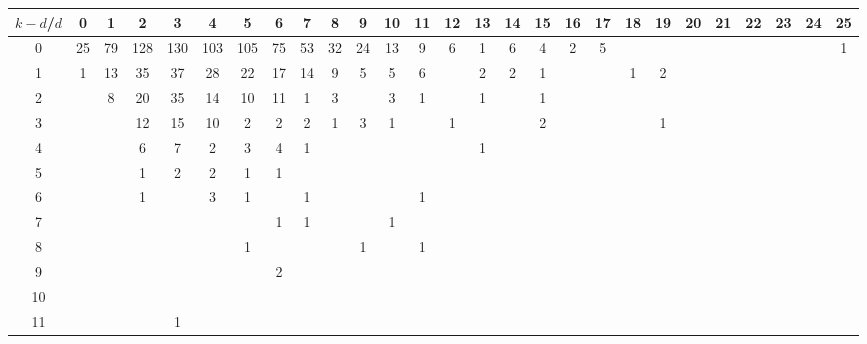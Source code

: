 \begin{landscape}

\begin{table}[h]\footnotesize
{\centering
\begin{tabular}{|c|c|
c|c|c|c|c|c|c|c|c|c|c|c|c|c|c|c|c|c|c|c|c|c|c|c|c|}
  \hline
  $k-d$/$d$
 & 0 & 1 & 2 & 3 & 4 & 5 & 6 & 7 & 8 & 9 & 10 & 11 & 12 & 13 & 14 & 15 & 16 & 17 & 18 & 19 & 20 & 21 & 22 & 23 & 24 & 25\\

  \hline
  \hline

0  & 25 & 79 & 128 & 130 & 103 & 105 & 75 & 53 & 32 & 24 & 13 & 9 & 6 & 1 & 6 & 4 & 2 & 5 &  &  &  &  &  &  &  & 1\\

1  & 1 & 13 & 35 & 37 & 28 & 22 & 17 & 14 & 9 & 5 & 5 & 6 &  & 2 & 2 & 1 &  &  & 1 & 2 &  &  &  &  &  & \\

2  &  & 8 & 20 & 35 & 14 & 10 & 11 & 1 & 3 &  & 3 & 1 &  & 1 &  & 1 &  &  &  &  &  &  &  &  &  & \\

3  &  &  & 12 & 15 & 10 & 2 & 2 & 2 & 1 & 3 & 1 &  & 1 &  &  & 2 &  &  &  & 1 &  &  &  &  &  & \\

4  &  &  & 6 & 7 & 2 & 3 & 4 & 1 &  &  &  &  &  & 1 &  &  &  &  &  &  &  &  &  &  &  & \\

5  &  &  & 1 & 2 & 2 & 1 & 1 &  &  &  &  &  &  &  &  &  &  &  &  &  &  &  &  &  &  & \\

6  &  &  & 1 &  & 3 & 1 &  & 1 &  &  &  & 1 &  &  &  &  &  &  &  &  &  &  &  &  &  & \\

7  &  &  &  &  &  &  & 1 & 1 &  &  & 1 &  &  &  &  &  &  &  &  &  &  &  &  &  &  & \\

8  &  &  &  &  &  & 1 &  &  &  & 1 &  & 1 &  &  &  &  &  &  &  &  &  &  &  &  &  & \\

9  &  &  &  &  &  &  & 2 &  &  &  &  &  &  &  &  &  &  &  &  &  &  &  &  &  &  & \\

10  &  &  &  &  &  &  &  &  &  &  &  &  &  &  &  &  &  &  &  &  &  &  &  &  &  & \\

11  &  &  &  & 1 &  &  &  &  &  &  &  &  &  &  &  &  &  &  &  &  &  &  &  &  &  & \\


\end{tabular}}
\end{table}
\end{landscape}
